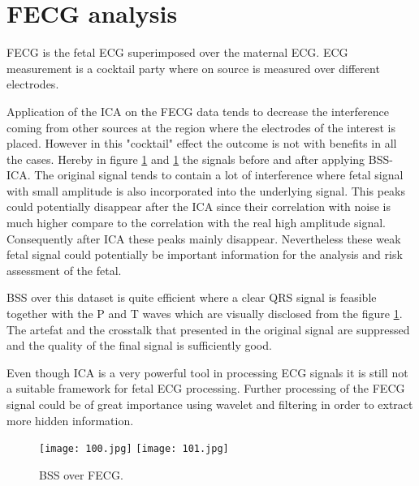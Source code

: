 \section{FECG analysis}
FECG is the fetal ECG superimposed over the maternal ECG. ECG measurement is a cocktail party where on source is measured over different electrodes.

Application of the ICA on the FECG data tends to decrease the interference coming from other sources at the region where the electrodes of the interest is placed. However in this "cocktail" effect the outcome is not with benefits in all the cases. Hereby in figure \ref{FECG1} and \ref{FECG1} the signals before and after applying BSS-ICA. The original signal tends to contain a lot of interference where fetal signal with small amplitude is also incorporated into the underlying signal. This peaks could potentially disappear after the ICA since their correlation with noise is much higher compare to the correlation with the real high amplitude signal. Consequently after ICA these peaks mainly disappear.  Nevertheless these weak fetal signal could potentially be important information for the analysis and risk assessment of the fetal. 

BSS over this dataset is quite efficient where a clear QRS signal is feasible together with the P and T waves which are visually disclosed from the figure \ref{FECG1}. The artefat and the crosstalk that presented in the original signal are suppressed and the quality of the final signal is sufficiently good.

Even though ICA is a very powerful tool in processing ECG signals it is still not a suitable framework for fetal ECG processing. Further processing of the FECG signal could be of great importance using wavelet and filtering in order to extract more hidden information. 

\begin{figure}[!htbp]
%
\centering
\texttt{[image: 100.jpg]}
\label{FECG2}
\endminipage\hfill
{}%
\centering
\texttt{[image: 101.jpg]}
\label{FECG1}
\endminipage\hfill
\caption{BSS over FECG.}
\end{figure}